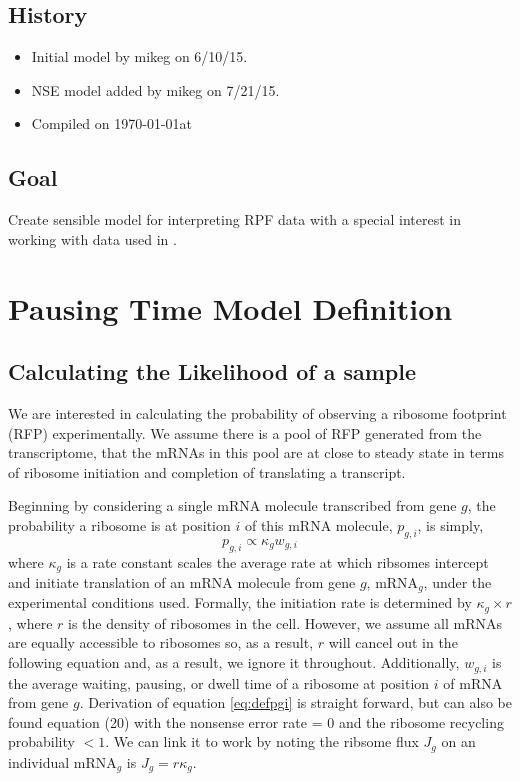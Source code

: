 \documentclass{article}
\newcommand{\waitTerm}{\ensuremath{w}\xspace}
\newcommand{\wgi}{\ensuremath{\waitTerm_{g,i}}\xspace}
\newcommand{\pgi}{\ensuremath{{p_{g,i}}}\xspace}
\newcommand{\kappag}{\ensuremath{{\kappa_{g}}}\xspace}
\newcommand{\mRNAg}{mRNA$_g$\xspace}
\begin{document}
\subsection*{History}
\begin{itemize}
\item Initial model  by mikeg on 6/10/15.
\item NSE model added by mikeg on 7/21/15.
\item Compiled on \today at \ \currenttime
 \end{itemize}
\subsection*{Goal}
\label{goal}
Create sensible model for interpreting RPF data with a special interest in working with data used in \citet{PopEtAl14}.

\section*{Pausing Time Model Definition}
\subsection*{Calculating the Likelihood of a sample}
We are interested in calculating the probability of observing a ribosome footprint (RFP) experimentally.
We assume there is a pool of RFP generated from the transcriptome, that the mRNAs in this pool are at close to steady state in terms of ribosome initiation and completion of translating a transcript.

Beginning by considering a single mRNA molecule transcribed from gene $g$, the probability a ribosome is at position $i$ of this mRNA molecule, \pgi,  is simply,
\begin{equation} \label{eq:defpgi}
\pgi  \propto \kappag \wgi
\end{equation}
where \kappag is a rate constant scales the average rate at which ribsomes intercept and initiate translation of an mRNA molecule from gene $g$, \mRNAg, under the experimental conditions used.
Formally, the initiation rate is determined by $\kappag \times r$, where  $r$ is the density of ribosomes in the cell.
However, we assume all mRNAs are equally accessible to ribosomes so, as a result, $r$ will cancel out in the following equation and, as a result, we ignore it throughout.
Additionally, \wgi is the average waiting, pausing, or dwell time of a ribosome at position $i$ of mRNA from gene $g$.  
Derivation of equation \ref{eq:defpgi} is straight forward, but can also be found \citet{GilchristAndWagner06} equation (20) with the nonsense error rate = 0 and the ribosome recycling probability $<1$.
We can link it to \citet{PopEtAl14} work by noting the ribsome flux $J_g$ on an individual \mRNAg is $J_g = r \kappag$.
\end{document}
